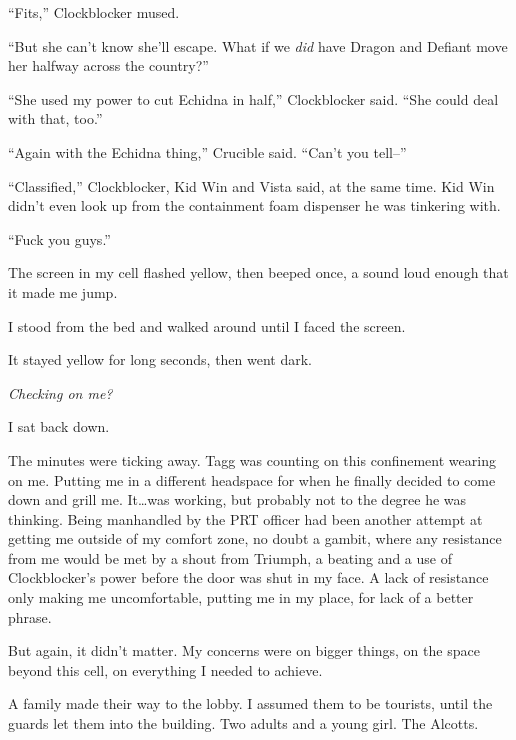 ``Fits,'' Clockblocker mused.



``But she can't know she'll escape.  What if we \emph{did} have Dragon and Defiant move her halfway across the country?''



``She used my power to cut Echidna in half,'' Clockblocker said.  ``She could deal with that, too.''



``Again with the Echidna thing,'' Crucible said.  ``Can't you tell--''



``Classified,'' Clockblocker, Kid Win and Vista said, at the same time.  Kid Win didn't even look up from the containment foam dispenser he was tinkering with.



``Fuck you guys.''



The screen in my cell flashed yellow, then beeped once, a sound loud enough that it made me jump.



I stood from the bed and walked around until I faced the screen.



It stayed yellow for long seconds, then went dark.



\emph{Checking on me?}



I sat back down.



The minutes were ticking away.  Tagg was counting on this confinement wearing on me.  Putting me in a different headspace for when he finally decided to come down and grill me.  It\ldots was working, but probably not to the degree he was thinking.  Being manhandled by the PRT officer had been another attempt at getting me outside of my comfort zone, no doubt a gambit, where any resistance from me would be met by a shout from Triumph, a beating and a use of Clockblocker's power before the door was shut in my face.  A lack of resistance only making me uncomfortable, putting me in my place, for lack of a better phrase.



But again, it didn't matter.  My concerns were on bigger things, on the space beyond this cell, on everything I needed to achieve.



A family made their way to the lobby.  I assumed them to be tourists, until the guards let them into the building.  Two adults and a young girl.  The Alcotts.



